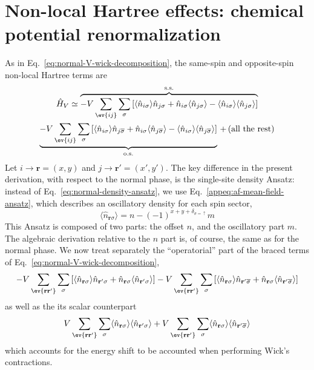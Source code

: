 \section{Non-local Hartree effects: chemical potential renormalization}\label{subsec:af-hartree-mu}

As in Eq.~\eqref{eq:normal-V-wick-decomposition}, the same-spin and opposite-spin non-local Hartree terms are
\begin{multline*}
	\hat H_V \simeq
	\overbrace{
		-V \sum_{\ev{ij}} \sum_\sigma \left[
			\langle
			\hat n_{i\sigma}
			\rangle \hat n_{j\sigma} + \hat n_{i\sigma} \langle
			\hat n_{j\sigma}
			\rangle - \langle
			\hat n_{i\sigma}
			\rangle \langle
			\hat n_{j\sigma}
			\rangle
		\right]
	}^{\mathrm{s.s.}} \\
	\underbrace{
		-V \sum_{\ev{ij}} \sum_\sigma \left[
			\langle
			\hat n_{i\sigma}
			\rangle \hat n_{j\overline{\sigma}} + \hat n_{i\sigma} \langle
			\hat n_{j\overline{\sigma}}
			\rangle
			- \langle
			\hat n_{i\sigma}
			\rangle \langle
			\hat n_{j\overline{\sigma}}
			\rangle
		\right]
	}_{\mathrm{o.s.}} \, +\,
	(\text{all the rest})
\end{multline*}
Let $i \to \mathbf{r} = (x,y)$ and $j \to \mathbf{r}' = (x',y')$. The key difference in the present derivation, with respect to the normal phase, is the single-site density Ansatz: instead of Eq.~\eqref{eq:normal-density-ansatz}, we use Eq.~\eqref{appeq:af-mean-field-ansatz}, which describes an oscillatory density for each spin sector,
\[
	\langle \hat n_{\mathbf{r}\sigma} \rangle = n - (-1)^{x+y+\delta_{\sigma=\uparrow}} m
\]
This Ansatz is composed of two parts: the offset $n$, and the oscillatory part $m$. The algebraic derivation relative to the $n$ part is, of course, the same as for the normal phase. We now treat separately the ``operatorial'' part of the braced terms of Eq.~\eqref{eq:normal-V-wick-decomposition},
\begin{equation}\label{eq:af-V-wick-decomposition-operatorial}
	-V \sum_{\ev{\mathbf{r}\mathbf{r}'}} \sum_\sigma \left[
		\langle
		\hat n_{\mathbf{r}\sigma}
		\rangle \hat n_{\mathbf{r}'\sigma} + \hat n_{\mathbf{r}\sigma} \langle
		\hat n_{\mathbf{r}'\sigma}
		\rangle
		\right] -V \sum_{\ev{\mathbf{r}\mathbf{r}'}} \sum_\sigma \left[
		\langle
		\hat n_{\mathbf{r}\sigma}
		\rangle \hat n_{\mathbf{r}'\overline{\sigma}} + \hat n_{\mathbf{r}\sigma} \langle
		\hat n_{\mathbf{r}'\overline{\sigma}}
		\rangle
	\right]
\end{equation}
as well as the its scalar counterpart
\begin{equation}\label{eq:af-V-wick-decomposition-double-counting}
	V \sum_{\ev{\mathbf{r}\mathbf{r}'}} \sum_\sigma
	\langle \hat n_{\mathbf{r}\sigma} \rangle \langle \hat n_{\mathbf{r}'\sigma} \rangle + V \sum_{\ev{\mathbf{r}\mathbf{r}'}} \sum_\sigma
	\langle \hat n_{\mathbf{r}\sigma} \rangle \langle \hat n_{\mathbf{r}'\overline{\sigma}} \rangle
\end{equation}
which accounts for the energy shift to be accounted when performing Wick's contractions.

